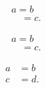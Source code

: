 \begin{align*}  & a = b \\ &\quad = c.
\end{align*}

\begin{equation*} \begin{split}  & a = b \\ &\quad = c.
\end{split}
\end{equation*}

\begin{align*}  a & = b \\ c & = d.
\end{align*}
